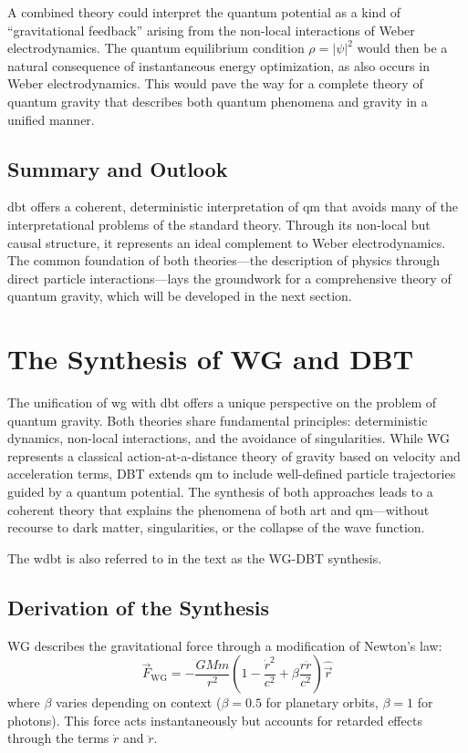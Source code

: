 A combined theory could interpret the quantum potential as a kind of \enquote{gravitational feedback} arising from the non-local interactions of Weber electrodynamics. The quantum equilibrium condition $\rho = \lvert \psi \rvert^{2}$ would then be a natural consequence of instantaneous energy optimization, as also occurs in Weber electrodynamics. This would pave the way for a complete theory of quantum gravity that describes both quantum phenomena and gravity in a unified manner.

\subsection{Summary and Outlook}
\gls{dbt} offers a coherent, deterministic interpretation of \gls{qm} that avoids many of the interpretational problems of the standard theory. Through its non-local but causal structure, it represents an ideal complement to Weber electrodynamics. The common foundation of both theories—the description of physics through direct particle interactions—lays the groundwork for a comprehensive theory of quantum gravity, which will be developed in the next section.

\section{The Synthesis of WG and DBT}
The unification of \gls{wg} with \gls{dbt} offers a unique perspective on the problem of quantum gravity. Both theories share fundamental principles: deterministic dynamics, non-local interactions, and the avoidance of singularities. While WG represents a classical action-at-a-distance theory of gravity based on velocity and acceleration terms, DBT extends \gls{qm} to include well-defined particle trajectories guided by a quantum potential. The synthesis of both approaches leads to a coherent theory that explains the phenomena of both \gls{art} and \gls{qm}—without recourse to dark matter, singularities, or the collapse of the wave function.

The \gls{wdbt} is also referred to in the text as the WG-DBT synthesis.

\subsection{Derivation of the Synthesis}
WG describes the gravitational force through a modification of Newton's law:
\begin{equation}
    \label{eq:wg-dbt}
    \vec{F}_{\text{WG}} = -\frac{GMm}{r^2}\left(1 - \frac{\dot{r}^2}{c^2} + \beta \frac{r\ddot{r}}{c^2}\right)\hat{\vec{r}}
\end{equation}
where $\beta$ varies depending on context ($\beta=0.5$ for planetary orbits, $\beta=1$ for photons). This force acts instantaneously but accounts for retarded effects through the terms $\dot{r}$ and $\ddot{r}$.

